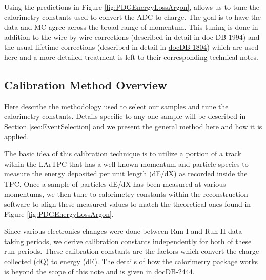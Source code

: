 Using the predictions in Figure \ref{fig:PDGEnergyLossArgon}, allows us to tune the calorimetry constants used to convert the ADC to charge. The goal is to have the data and MC agree across the broad range of momentum. This tuning is done in addition to the wire-by-wire corrections (described in detail in \href{http://lartpc-docdb.fnal.gov:8080/cgi-bin/RetrieveFile?docid=1994&filename=investigation-uniformity-observed_v3.pdf&version=2}{doc-DB 1994}) and the usual lifetime corrections (described in detail in \href{http://lartpc-docdb.fnal.gov:8080/cgi-bin/ShowDocument?docid=1804}{docDB-1804}) which are used here and a more detailed treatment is left to their corresponding technical notes.

\subsection{Calibration Method Overview}\label{sec:MethodOverview}

Here describe the methodology used to select our samples and tune the calorimetry constants. Details specific to any one sample will be described in Section  \ref{sec:EventSelection} and we present the general method here and how it is applied. 

The basic idea of this calibration technique is to utilize a portion of a track within the LArTPC that has a well known momentum and particle species to measure the energy deposited per unit length (dE/dX) as recorded inside the TPC. Once a sample of particles dE/dX has been measured at various momentums, we then tune to calorimetry constants within the reconstruction software to align these measured values to match the theoretical ones found in Figure \ref{fig:PDGEnergyLossArgon}.

Since various electronics changes were done between Run-I and Run-II data taking periods, we derive calibration constants independently for both of these run periods. These calibration constants are the factors which convert the charge collected (dQ) to energy (dE). The details of how the calorimetry package works is beyond the scope of this note and is given in \href{http://lartpc-docdb.fnal.gov:8080/cgi-bin/ShowDocument?docid=2444}{docDB-2444}.

